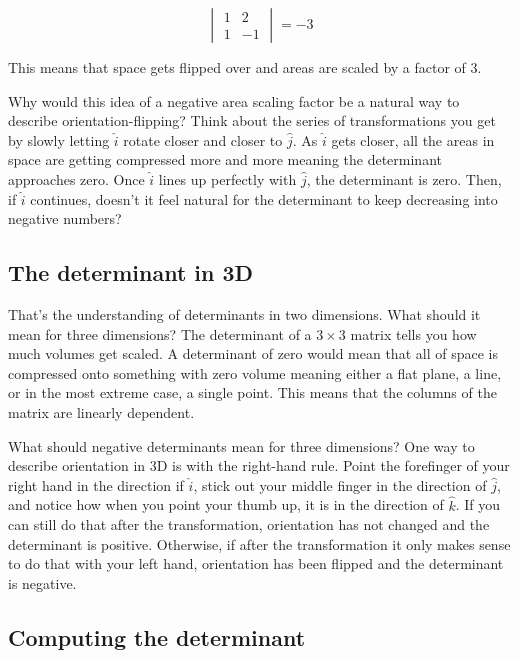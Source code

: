 \begin{equation*}
  \begin{vmatrix}
    1 & 2 \\
    1 & -1
  \end{vmatrix} = -3
\end{equation*}

This means that space gets flipped over and areas are scaled by a factor of $3$.

Why would this idea of a negative area scaling factor be a natural way to
describe orientation-flipping? Think about the series of transformations you get
by slowly letting $\hat{i}$ rotate closer and closer to $\hat{j}$. As $\hat{i}$
gets closer, all the areas in space are getting compressed more and more meaning
the determinant approaches zero. Once $\hat{i}$ lines up perfectly with
$\hat{j}$, the determinant is zero. Then, if $\hat{i}$ continues, doesn't it
feel natural for the determinant to keep decreasing into negative numbers?

\subsection{The determinant in 3D}

That's the understanding of determinants in two dimensions. What should it mean
for three dimensions? The determinant of a $3 \times 3$ matrix tells you how
much volumes get scaled. A determinant of zero would mean that all of space is
compressed onto something with zero volume meaning either a flat plane, a line,
or in the most extreme case, a single point. This means that the columns of the
matrix are linearly dependent.

What should negative determinants mean for three dimensions? One way to describe
orientation in 3D is with the right-hand rule. Point the forefinger of your
right hand in the direction if $\hat{i}$, stick out your middle finger in the
direction of $\hat{j}$, and notice how when you point your thumb up, it is in
the direction of $\hat{k}$. If you can still do that after the transformation,
orientation has not changed and the determinant is positive. Otherwise, if after
the transformation it only makes sense to do that with your left hand,
orientation has been flipped and the determinant is negative.

\subsection{Computing the determinant}

